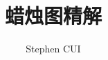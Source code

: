 \documentclass[openany]{book}
\author{Stephen CUI}
\title{蜡烛图精解}
\begin{document}
\frontmatter
\maketitle
\begin{multicols}{2}
    \tableofcontents
\end{multicols}

\mainmatter
% 
% 
% 
% 
% 




\end{document}
